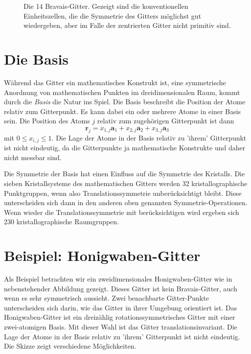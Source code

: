 \begin{figure}
\caption{Die 14 Bravais-Gitter. \label{fig:gitter_bravais14}  Gezeigt sind die konventionellen Einheitszellen, die die Symmetrie  des Gitters möglichst gut wiedergeben, aber im Falle der zentrierten Gitter nicht primitiv sind.
}
\end{figure}


\section{Die Basis}


Während das Gitter ein mathematisches Konstrukt ist, eine symmetrische Anordnung von mathematischen Punkten im dreidimensionalen Raum, kommt durch die \emph{Basis} die Natur ins Spiel. Die Basis beschreibt die Position der Atome relativ zum Gitterpunkt. Es kann dabei ein oder mehrere Atome in einer Basis sein. Die Position des Atoms $j$ relativ zum zugehörigen Gitterpunkt ist dann 
\begin{equation}
 \mathbf{r}_j = x_{1,j} \mathbf{a}_1 + x_{2,j} \mathbf{a}_2 + x_{3,j} \mathbf{a}_3  
\end{equation}
mit $0 \le x_{i,j} \le 1$. Die Lage der Atome in der Basis relativ zu 'ihrem' Gitterpunkt ist nicht eindeutig, da die Gitterpunkte ja mathematische Konstrukte und daher nicht messbar sind.


Die Symmetrie der Basis hat einen Einfluss auf die Symmetrie des Kristalls. Die sieben Kristallsysteme des mathematischen Gitters werden 32 kristallographische Punktgruppen, wenn also Translationssymmetrie unberücksichtigt bleibt. Diese unterscheiden sich dann in den anderen oben genannten Symmetrie-Operationen.
Wenn wieder die Translationssymmetrie mit berücksichtigen wird ergeben sich 230 kristallographische Raumgruppen.


\section{Beispiel: Honigwaben-Gitter}

Als Beispiel betrachten wir ein zweidimensionales Honigwaben-Gitter wie in nebenstehender Abbildung gezeigt. Dieses Gitter ist kein Bravais-Gitter, auch wenn es sehr symmetrisch aussieht. Zwei benachbarte Gitter-Punkte unterscheiden sich darin, wie das Gitter in ihrer Umgebung orientiert ist. Das  Honigwaben-Gitter ist ein dreizählig rotationssymmetrisches Gitter mit einer zwei-atomigen Basis. Mit dieser Wahl ist das Gitter translationsinvariant. Die Lage der Atome in der Basis relativ zu 'ihrem' Gitterpunkt ist nicht eindeutig. Die Skizze zeigt verschiedene Möglichkeiten.



